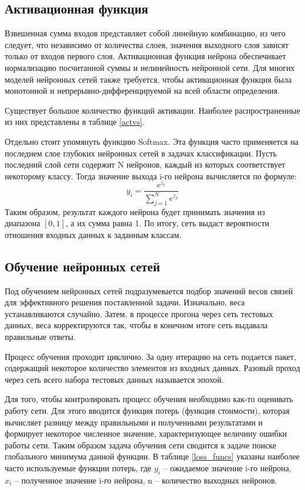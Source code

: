 \subsection{Активационная функция}
\label{sec:activation}
Взвешенная сумма входов представляет собой линейную комбинацию, из чего следует, что независимо от количества слоев, значения выходного слоя зависят только от входов первого слоя. 
Активационная функция нейрона обеспечивает нормализацию посчитанной суммы и нелинейность нейронной сети. Для многих моделей нейронных сетей также требуется, чтобы активационная функция была монотонной и непрерывно-дифференцируемой на всей области определения.

Существует большое количество функций активации. Наиболее распространенные из них представлены в таблице \ref{actvs}.



Отдельно стоит упомянуть функцию Softmax. Эта функция часто применяется на последнем слое глубоких нейронных сетей в задачах классификации. Пусть последний слой сети содержит N нейронов, каждый из которых соответствует некоторому классу. Тогда значение выхода i-го нейрона вычисляется по формуле: 
\[
    y_i=\frac{e^{z_i}}{\sum\limits_{j=1}^{N}e^{z_j}}
\]
Таким образом, результат каждого нейрона будет принимать значения из диапазона $[0,1]$, а их сумма равна 1. По итогу, сеть выдаст вероятности отношения входных данных к заданным классам.
\clearpage
\subsection{Обучение нейронных сетей}
Под обучением нейронных сетей подразумевается подбор значений весов связей для эффективного решения поставленной задачи. Изначально, веса устанавливаются случайно. Затем, в процессе прогона через сеть тестовых данных, веса корректируются так, чтобы в конечном итоге сеть выдавала правильные ответы. 

Процесс обучения проходит циклично. За одну итерацию на сеть подается пакет, содержащий некоторое количество элементов из входных данных. Разовый проход через сеть всего набора тестовых данных называется эпохой.

Для того, чтобы контролировать процесс обучения необходимо как-то оценивать работу сети. Для этого вводится функция потерь (функция стоимости), которая вычисляет разницу между правильными и полученными результатами и формирует некоторое численное значение, характеризующее величину ошибки работы сети. Таким образом задача обучения сети сводится к задаче поиске глобального минимума данной функции. В таблице \ref{loss_funcs} указаны наиболее часто используемые функции потерь, где $y_i$ – ожидаемое значение i-го нейрона, $x_i$ – полученное значение i-го нейрона, n – количество выходных нейронов.


